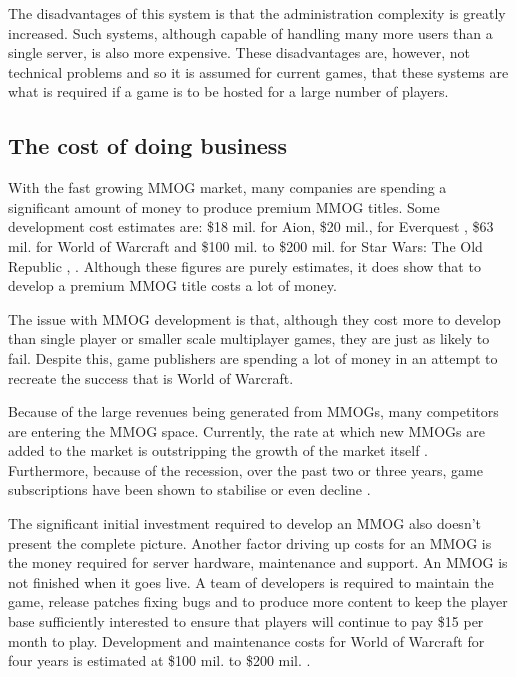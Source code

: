 The disadvantages of this system is that the administration complexity is greatly increased. Such systems, although capable of handling many more users than a single server, is also more expensive. These disadvantages are, however, not technical problems and so it is assumed for current games, that these systems are what is required if a game is to be hosted for a large number of players.

\subsection{The cost of doing business}
\label{mmog_cost}

With the fast growing MMOG market, many companies are spending a significant amount of money to produce premium MMOG titles. Some development cost estimates are: \$18 mil. for Aion, \$20 mil., for Everquest \cite{aion_everquest_cost}, \$63 mil. for World of Warcraft \cite{wow_cost} and \$100 mil. to \$200 mil. for Star Wars: The Old Republic \cite{star_wars_cost_1}, \cite{star_wars_cost_2}. Although these figures are purely estimates, it does show that to develop a premium MMOG title costs a lot of money.

The issue with MMOG development is that, although they cost more to develop than single player or smaller scale multiplayer games, they are just as likely to fail. Despite this, game publishers are spending a lot of money in an attempt to recreate the success that is World of Warcraft.

Because of the large revenues being generated from MMOGs, many competitors are entering the MMOG space. Currently, the rate at which new MMOGs are added to the market is outstripping the growth of the market itself \cite{newzoo_mmo_report}. Furthermore, because of the recession, over the past two or three years, game subscriptions have been shown to stabilise or even decline \cite{mmo_growth_chart}.

The significant initial investment required to develop an MMOG also doesn't present the complete picture. Another factor driving up costs for an MMOG is the money required for server hardware, maintenance and support. An MMOG is not finished when it goes live. A team of developers is required to maintain the game, release patches fixing bugs and to produce more content to keep the player base sufficiently interested to ensure that players will continue to pay \$15 per month to play. Development and maintenance costs for World of Warcraft for four years is estimated at \$100 mil. to \$200 mil. \cite{wow_cost}.

